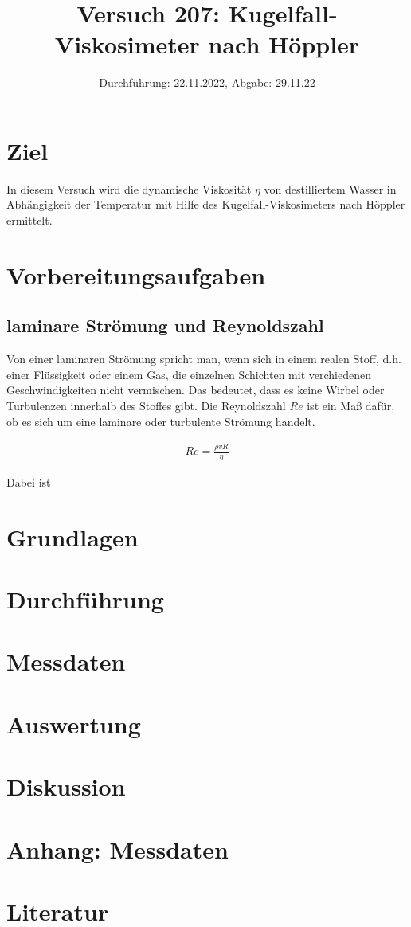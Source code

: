 

\title{Versuch 207: Kugelfall-Viskosimeter nach Höppler}
\date{Durchführung: 22.11.2022, Abgabe: 29.11.22}



\maketitle

\tableofcontents
\newpage

\section{Ziel}
In diesem Versuch wird die dynamische Viskosität $\eta$ von destilliertem Wasser in Abhängigkeit der Temperatur mit Hilfe des 
Kugelfall-Viskosimeters nach Höppler ermittelt.

\section{Vorbereitungsaufgaben}
\subsection{laminare Strömung und Reynoldszahl}
Von einer laminaren Strömung spricht man, wenn sich in einem realen Stoff, d.h. einer Flüssigkeit oder einem Gas,
die einzelnen Schichten mit verchiedenen Geschwindigkeiten nicht vermischen. Das bedeutet, dass es keine Wirbel oder
Turbulenzen innerhalb des Stoffes gibt.
Die Reynoldszahl $Re$ ist ein Maß dafür, ob es sich um eine laminare oder turbulente Strömung handelt.

\begin{align}
    Re = \frac{\rho \overline{v} R}{\eta}
\end{align}

Dabei ist %

\section{Grundlagen}

\section{Durchführung}

\section{Messdaten}

\section{Auswertung}

\section{Diskussion}

\section*{Anhang: Messdaten}

\section*{Literatur}


